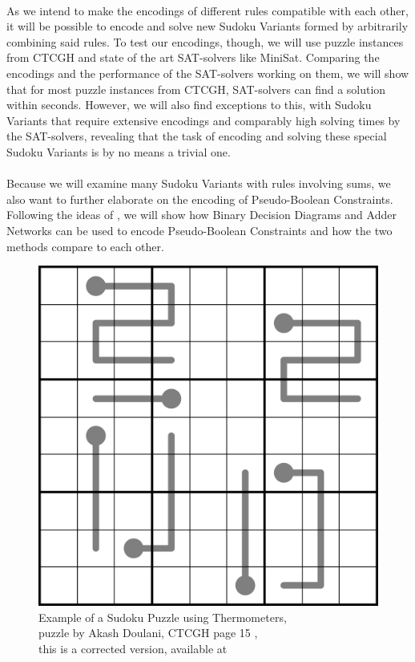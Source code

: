 \\
As we intend to make the encodings of different rules compatible with each other, it will be possible to encode and solve new Sudoku Variants formed by arbitrarily combining said rules. To test our encodings, though, we will use puzzle instances from CTCGH and state of the art SAT-solvers like MiniSat. Comparing the encodings and the performance of the SAT-solvers working on them, we will show that for most puzzle instances from CTCGH, SAT-solvers can find a solution within seconds. However, we will also find exceptions to this, with Sudoku Variants that require extensive encodings and comparably high solving times by the SAT-solvers, revealing that the task of encoding and solving these special Sudoku Variants is by no means a trivial one.\\
\\
Because we will examine many Sudoku Variants with rules involving sums, we also want to further elaborate on the encoding of Pseudo-Boolean Constraints. Following the ideas of \cite{Een2006TranslatingPC}, we will show how Binary Decision Diagrams and Adder Networks can be used to encode Pseudo-Boolean Constraints and how the two methods compare to each other.

\begin{figure}
\centering
\captionsetup{justification=centering,margin=0cm}
\includegraphics[width=\textwidth]{Figures/Thermo2020.png}
\caption{Example of a Sudoku Puzzle using Thermometers,\\puzzle by Akash Doulani, CTCGH page 15 \cite{CrackingTheCryptic2021},\\this is a corrected version, available at \cite{OnlineSolutionThermo2020} }
\label{fig:Thermo2020}
\end{figure}





